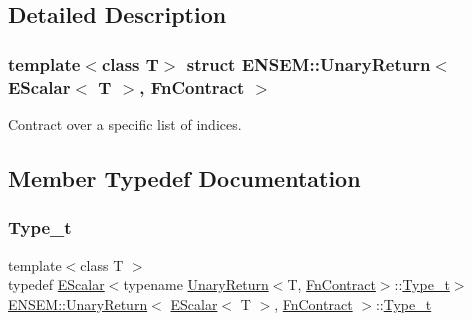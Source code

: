 \subsection{Detailed Description}
\subsubsection*{template$<$class T$>$\newline
struct E\+N\+S\+E\+M\+::\+Unary\+Return$<$ E\+Scalar$<$ T $>$, Fn\+Contract $>$}

Contract over a specific list of indices. 

\subsection{Member Typedef Documentation}
\mbox{\label{structENSEM_1_1UnaryReturn_3_01EScalar_3_01T_01_4_00_01FnContract_01_4_a0838f4fd4b6341784128502cc2256180}} 
\subsubsection{\texorpdfstring{Type\_t}{Type\_t}\hspace{0.1cm}{\footnotesize\ttfamily [1/3]}}
{\footnotesize\ttfamily template$<$class T $>$ \\
typedef \mbox{\hyperlink{classENSEM_1_1EScalar}{E\+Scalar}}$<$typename \mbox{\hyperlink{structENSEM_1_1UnaryReturn}{Unary\+Return}}$<$T, \mbox{\hyperlink{structENSEM_1_1FnContract}{Fn\+Contract}}$>$\+::\mbox{\hyperlink{structENSEM_1_1UnaryReturn_3_01EScalar_3_01T_01_4_00_01FnContract_01_4_a0838f4fd4b6341784128502cc2256180}{Type\+\_\+t}}$>$ \mbox{\hyperlink{structENSEM_1_1UnaryReturn}{E\+N\+S\+E\+M\+::\+Unary\+Return}}$<$ \mbox{\hyperlink{classENSEM_1_1EScalar}{E\+Scalar}}$<$ T $>$, \mbox{\hyperlink{structENSEM_1_1FnContract}{Fn\+Contract}} $>$\+::\mbox{\hyperlink{structENSEM_1_1UnaryReturn_3_01EScalar_3_01T_01_4_00_01FnContract_01_4_a0838f4fd4b6341784128502cc2256180}{Type\+\_\+t}}}

\mbox{\label{structENSEM_1_1UnaryReturn_3_01EScalar_3_01T_01_4_00_01FnContract_01_4_a0838f4fd4b6341784128502cc2256180}} 
